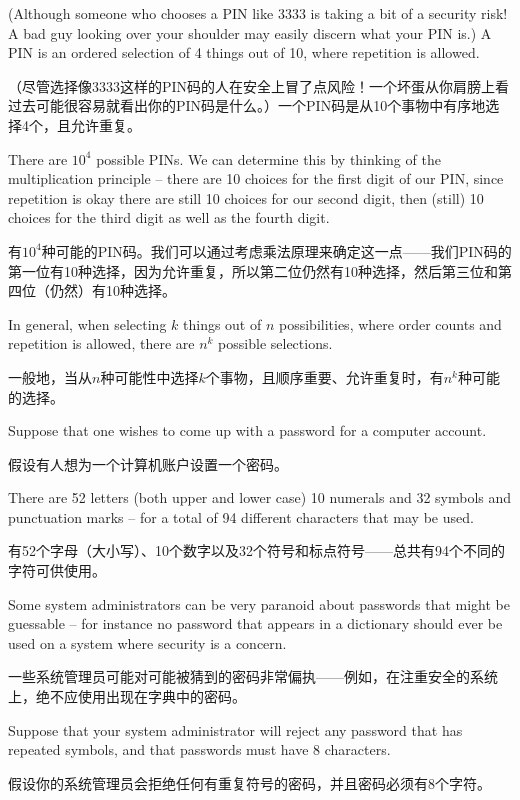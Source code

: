 (Although someone who chooses a PIN like 3333 is taking a bit of a security
risk!  A bad guy looking over your shoulder may easily discern what your
PIN is.)  A PIN is an ordered selection of 4 things out of 10, where 
repetition is allowed.

（尽管选择像3333这样的PIN码的人在安全上冒了点风险！一个坏蛋从你肩膀上看过去可能很容易就看出你的PIN码是什么。）一个PIN码是从10个事物中有序地选择4个，且允许重复。

There are $10^4$ possible PINs.  We can determine
this by thinking of the multiplication principle -- there are 10 choices 
for the first digit of our PIN, since repetition is okay there are still
10 choices for our second digit, then (still) 10 choices for the third
digit as well as the fourth digit.

有$10^4$种可能的PIN码。我们可以通过考虑乘法原理来确定这一点——我们PIN码的第一位有10种选择，因为允许重复，所以第二位仍然有10种选择，然后第三位和第四位（仍然）有10种选择。

In general, when selecting $k$ things out of $n$ possibilities, where order
counts and repetition is allowed, there are $n^k$ possible selections.

一般地，当从$n$种可能性中选择$k$个事物，且顺序重要、允许重复时，有$n^k$种可能的选择。


Suppose that one wishes to come up with a password for a computer
account.

假设有人想为一个计算机账户设置一个密码。

There are 52 letters (both upper and lower case) 10 numerals
and 32 symbols and punctuation marks -- for a total of 94 different 
characters that 
may be used.

有52个字母（大小写）、10个数字以及32个符号和标点符号——总共有94个不同的字符可供使用。

Some system administrators can be very paranoid about
passwords that might be guessable -- for instance no password that 
appears in a dictionary should ever be used on a system where security
is a concern.

一些系统管理员可能对可能被猜到的密码非常偏执——例如，在注重安全的系统上，绝不应使用出现在字典中的密码。

Suppose that your system administrator will reject any 
password that has repeated symbols, and that passwords must have 8 
characters.

假设你的系统管理员会拒绝任何有重复符号的密码，并且密码必须有8个字符。

